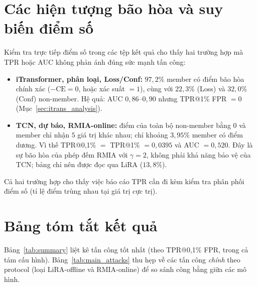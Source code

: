 \documentclass[12pt,a4paper]{report}
\begin{document}
\section{Các hiện tượng bão hòa và suy biến điểm số}
\label{sec:artifacts}

Kiểm tra trực tiếp điểm số trong các tệp kết quả cho thấy hai trường hợp mà TPR hoặc AUC không phản ánh đúng sức mạnh tấn công:
\begin{itemize}
  \item \textbf{iTransformer, phân loại, Loss/Conf:} $97{,}2\%$ member có điểm bão hòa chính xác ($-\mathrm{CE} = 0$, hoặc xác suất $=1$), cùng với $22{,}3\%$ (Loss) và $32{,}0\%$ (Conf) non-member. Hệ quả: AUC $0{,}86$--$0{,}90$ nhưng TPR@1\% FPR $= 0$ (Mục~\ref{sec:itrans_analysis}).
  \item \textbf{TCN, dự báo, RMIA-online:} điểm của toàn bộ non-member bằng $0$ và member chỉ nhận $5$ giá trị khác nhau; chỉ khoảng $3{,}95\%$ member có điểm dương. Vì thế TPR@0,1\% $=$ TPR@1\% $= 0{,}0395$ và AUC $= 0{,}520$. Đây là sự bão hòa của phép đếm RMIA với $\gamma = 2$, không phải khả năng bảo vệ của TCN; bảng chỉ nên được đọc qua LiRA ($13{,}8\%$).
\end{itemize}
Cả hai trường hợp cho thấy việc báo cáo TPR cần đi kèm kiểm tra phân phối điểm số (tỉ lệ điểm trùng nhau tại giá trị cực trị).

\section{Bảng tóm tắt kết quả}

Bảng~\ref{tab:summary} liệt kê tấn công tốt nhất (theo TPR@0,1\% FPR, trong cả tám cấu hình). Bảng~\ref{tab:main_attacks} thu hẹp về các tấn công \textit{chính} theo protocol (loại LiRA-offline và RMIA-online) để so sánh công bằng giữa các mô hình.
\end{document}
